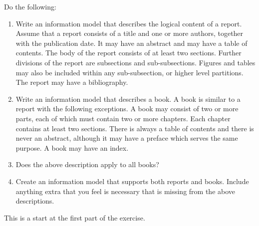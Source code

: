 \documentclass{article}
\begin{document}
\begin{itshape}
Do the following:
  \begin{enumerate}
  \item Write an information model that describes the logical content of a report.
        Assume that a report consists of a title and one or more authors, together 
        with the publication date. It may have an abstract and may have a table of
        contents. The body of the report consists of at least two sections.
        Further divisions of the report are subsections and sub-subsections.
        Figures and tables may also be included within any sub-subsection, or
        higher level partitions. The report may have a bibliography.
  \item Write an information model that describes a book. A book is similar to
        a report with the following exceptions. A book may consist of two or more
        parts, each of which must contain two or more chapters. Each chapter
        contains at least two sections. There is always a table of contents and 
        there is never an abstract, although it may have a preface which serves the
        same purpose. A book may have an index.
  \item Does the above description apply to all books?
  \item Create an information model that supports both reports and books. Include
        anything extra that you feel is necessary that is missing from the above
        descriptions.
  \end{enumerate}
\end{itshape}

    This is a start at the first part of the exercise.
\end{document}
